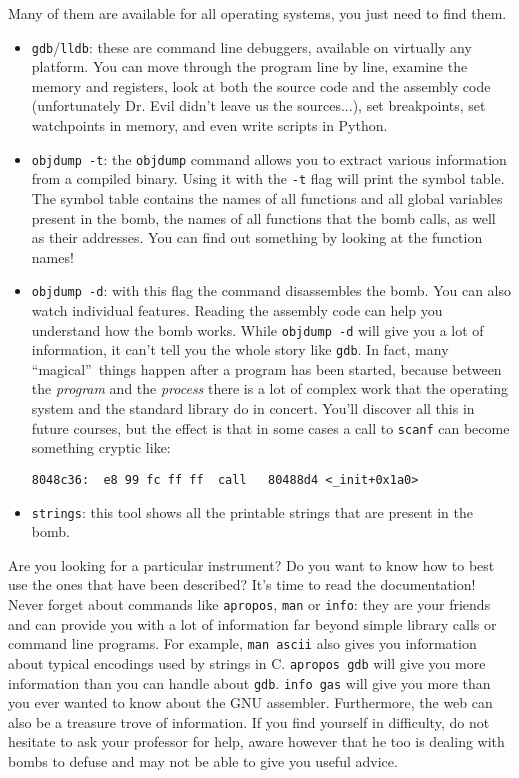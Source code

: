 \documentclass[a4paper,12pt]{report}  %
\newcommand{\lstinlinebg}[1]{\colorbox{backcolour}{\lstinline|#1|}}
\begin{document}
Many of them are available for all operating systems, you just need to find them.
\begin{itemize}
    \item \lstinlinebg{gdb}/\lstinlinebg{lldb}: these are command line debuggers, available on virtually any platform. You can move through the program line by line, examine the memory and registers, look at both the source code and the assembly code (unfortunately Dr. Evil didn't leave us the sources...), set breakpoints, set watchpoints in memory, and even write scripts in Python.
    \item \lstinlinebg{objdump -t}: the \lstinlinebg{objdump} command allows you to extract various information from a compiled binary. Using it with the \lstinlinebg{-t} flag will print the symbol table. The symbol table contains the names of all functions and all global variables present in the bomb, the names of all functions that the bomb calls, as well as their addresses. You can find out something by looking at the function names!
    \item \lstinlinebg{objdump -d}: with this flag the command disassembles the bomb. You can also watch individual features. Reading the assembly code can help you understand how the bomb works. While \lstinlinebg{objdump -d} will give you a lot of information, it can't tell you the whole story like \lstinlinebg{gdb}. In fact, many \textquotedblleft magical\textquotedblright\ things happen after a program has been started, because between the \textit{program} and the \textit{process} there is a lot of complex work that the operating system and the standard library do in concert. You'll discover all this in future courses, but the effect is that in some cases a call to \lstinlinebg{scanf} can become something cryptic like:
        \begin{lstlisting}[keywords={call}]
8048c36:  e8 99 fc ff ff  call   80488d4 <_init+0x1a0>\end{lstlisting}
    \item \lstinlinebg{strings}: this tool shows all the printable strings that are present in the bomb.
\end{itemize}
Are you looking for a particular instrument?
Do you want to know how to best use the ones that have been described?
It's time to read the documentation!
Never forget about commands like \lstinlinebg{apropos}, \lstinlinebg{man} or \lstinlinebg{info}: they are your friends and can provide you with a lot of information far beyond simple library calls or command line programs.
For example, \lstinlinebg{man ascii} also gives you information about typical encodings used by strings in C.
\lstinlinebg{apropos gdb} will give you more information than you can handle about \lstinlinebg{gdb}.
\lstinlinebg{info gas} will give you more than you ever wanted to know about the GNU assembler.
Furthermore, the web can also be a treasure trove of information.
If you find yourself in difficulty, do not hesitate to ask your professor for help, aware however that he too is dealing with bombs to defuse and may not be able to give you useful advice.
\end{document}
